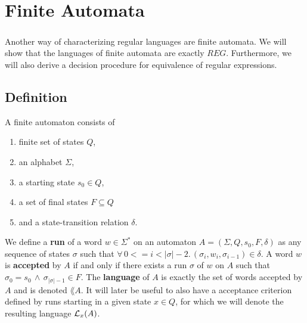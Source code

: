 \documentclass[11pt,a4paper,oneside]{book}
\begin{document}
                \begin{theorem}
                    \label{mem_der_correct} 
                    
                \end{theorem}

            

    \chapter{Finite Automata}
        \paragraph{} 
        Another way of characterizing regular languages are finite automata. 
        We will show that the languages of finite automata are exactly $REG$. 
        Furthermore, we will also derive a decision procedure for equivalence of regular expressions.

        \section{Definition}
            A finite automaton consists of
            \begin{enumerate}
                \item
                    finite set of states $Q$, 
                \item 
                    an alphabet $\Sigma$, 
                \item 
                    a starting state $s_0 \in Q$, 
                \item 
                    a set of final states $F \subseteq Q$ 
                \item 
                    and a state-transition relation $\delta$. \cite{DBLP:books/daglib/0011126}
            \end{enumerate}

                We define a \textbf{run} of a word $w \in \Sigma^*$ on an automaton $A = (\Sigma, Q, s_0, F, \delta)$ as any sequence of states $\sigma$ such that 
                $\forall \, 0 <= i < \vert\sigma\vert-2. \, (\sigma_i, w_i, \sigma_{i-1}) \in \delta$.
            A word $w$ is \textbf{accepted} by $A$ if and only if there exists a run $\sigma$ of $w$ on $A$ such that $\sigma_0 = s_0 \, \wedge \, \sigma_{\vert\sigma\vert-1} \in F$.
            The \textbf{language} of $A$ is exactly the set of words accepted by $A$ and is denoted $\lang{A}$. 
            It will later be useful to also have a acceptance criterion defined by runs starting in a given state $x \in Q$, for which we will denote the resulting language $\mathcal{L}_x(A)$.
\end{document}
